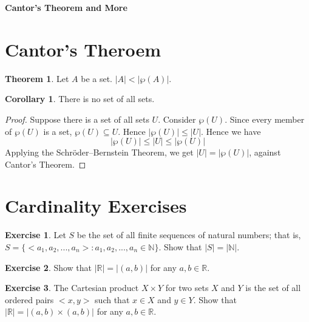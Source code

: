 \documentclass[11pt]{article}
\theoremstyle{definition}
\newtheorem{exer}{Exercise}
\newtheorem{theorem}{Theorem}[section]
\newtheorem{corollary}{Corollary}[theorem]
\begin{document}




\begin{center}
{\LARGE \bf Cantor's Theorem and More}
\end{center}

\smallskip

\section{Cantor's Theroem}

\begin{theorem}
Let $A$ be a set. $|A| < |\wp(A)|$.
\end{theorem}

\begin{corollary} \label{Corollary 1.1.1}
There is no set of all sets.
\end{corollary}
\begin{proof}
Suppose there is a set of all sets $U$. Consider $\wp(U)$. Since every member of $\wp(U)$ is a set, $\wp(U) \subseteq U $. Hence $|\wp(U)| \leqslant |U|$. Hence we have
$$ |\wp(U)| \leqslant |U| \leqslant |\wp(U)| $$
Applying the Schr\"{o}der–Bernstein Theorem, we get $|U|=|\wp(U)|$, against Cantor's Theorem.
\end{proof}

\section{Cardinality Exercises}

\begin{exer}
Let $S$ be the set of all finite sequences of natural numbers; that is, $S = \{ <a_1, a_2, ..., a_n> : a_1, a_2, ..., a_n \in \mathbb{N} \}$. Show that $|S|=|\mathbb{N}|$.
\end{exer}

\begin{exer}
Show that $|\mathbb{R}|=|(a,b)|$ for any $a, b\in \mathbb{R}$.
\end{exer}

\begin{exer}
The Cartesian product $X \times Y$ for two sets $X$ and $Y$ is the set of all ordered pairs $<x,y>$ such that $x \in X$ and $y \in Y$.
Show that $|\mathbb{R}|=|(a,b)\times(a,b)|$ for any $a, b\in \mathbb{R}$.
\end{exer}
\end{document}
